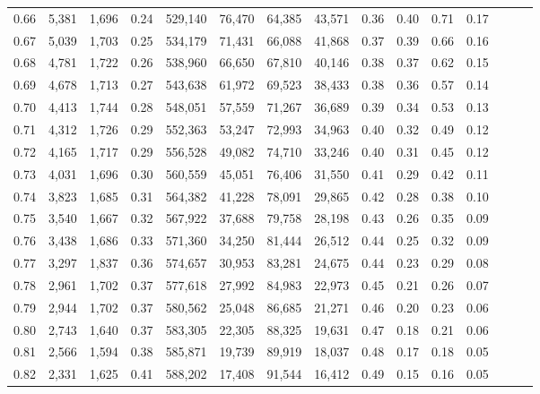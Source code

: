 \begin{tabular}{rrrrrrrrrrrrrrr}
0.66 &   5,381 &  1,696 &  0.24 &  529,140 &   76,470 &   64,385 &   43,571 &  0.36 &  0.40 &  0.71 &      0.17 \\
0.67 &   5,039 &  1,703 &  0.25 &  534,179 &   71,431 &   66,088 &   41,868 &  0.37 &  0.39 &  0.66 &      0.16 \\
0.68 &   4,781 &  1,722 &  0.26 &  538,960 &   66,650 &   67,810 &   40,146 &  0.38 &  0.37 &  0.62 &      0.15 \\
0.69 &   4,678 &  1,713 &  0.27 &  543,638 &   61,972 &   69,523 &   38,433 &  0.38 &  0.36 &  0.57 &      0.14 \\
0.70 &   4,413 &  1,744 &  0.28 &  548,051 &   57,559 &   71,267 &   36,689 &  0.39 &  0.34 &  0.53 &      0.13 \\
0.71 &   4,312 &  1,726 &  0.29 &  552,363 &   53,247 &   72,993 &   34,963 &  0.40 &  0.32 &  0.49 &      0.12 \\
0.72 &   4,165 &  1,717 &  0.29 &  556,528 &   49,082 &   74,710 &   33,246 &  0.40 &  0.31 &  0.45 &      0.12 \\
0.73 &   4,031 &  1,696 &  0.30 &  560,559 &   45,051 &   76,406 &   31,550 &  0.41 &  0.29 &  0.42 &      0.11 \\
0.74 &   3,823 &  1,685 &  0.31 &  564,382 &   41,228 &   78,091 &   29,865 &  0.42 &  0.28 &  0.38 &      0.10 \\
0.75 &   3,540 &  1,667 &  0.32 &  567,922 &   37,688 &   79,758 &   28,198 &  0.43 &  0.26 &  0.35 &      0.09 \\
0.76 &   3,438 &  1,686 &  0.33 &  571,360 &   34,250 &   81,444 &   26,512 &  0.44 &  0.25 &  0.32 &      0.09 \\
0.77 &   3,297 &  1,837 &  0.36 &  574,657 &   30,953 &   83,281 &   24,675 &  0.44 &  0.23 &  0.29 &      0.08 \\
0.78 &   2,961 &  1,702 &  0.37 &  577,618 &   27,992 &   84,983 &   22,973 &  0.45 &  0.21 &  0.26 &      0.07 \\
0.79 &   2,944 &  1,702 &  0.37 &  580,562 &   25,048 &   86,685 &   21,271 &  0.46 &  0.20 &  0.23 &      0.06 \\
0.80 &   2,743 &  1,640 &  0.37 &  583,305 &   22,305 &   88,325 &   19,631 &  0.47 &  0.18 &  0.21 &      0.06 \\
0.81 &   2,566 &  1,594 &  0.38 &  585,871 &   19,739 &   89,919 &   18,037 &  0.48 &  0.17 &  0.18 &      0.05 \\
0.82 &   2,331 &  1,625 &  0.41 &  588,202 &   17,408 &   91,544 &   16,412 &  0.49 &  0.15 &  0.16 &      0.05 \\

\end{tabular}
